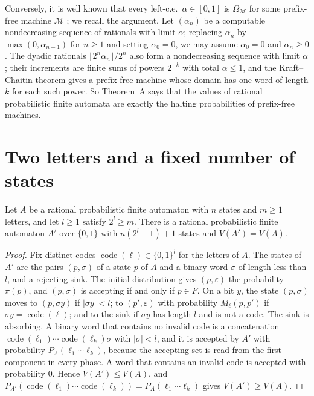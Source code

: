 \documentclass[11pt]{article}
\theoremstyle{plain}
\theoremstyle{definition}
\theoremstyle{remark}
\newcommand{\eps}{\varepsilon}
\newcommand{\code}{\operatorname{code}}
\begin{document}
\begin{remark}\label{rem:halting}
Conversely, it is well known that every left-c.e.\ $\alpha\in[0,1]$ is $\Omega_{\mathcal M}$ for some prefix-free machine $\mathcal M$ \cite{CHKW01,DH10}; we recall the argument. Let $(\alpha_n)$ be a computable nondecreasing sequence of rationals with limit $\alpha$; replacing $\alpha_n$ by $\max(0,\alpha_{n-1})$ for $n\ge1$ and setting $\alpha_0=0$, we may assume $\alpha_0=0$ and $\alpha_n\ge0$. The dyadic rationals $\lfloor2^n\alpha_n\rfloor/2^n$ also form a nondecreasing sequence with limit $\alpha$; their increments are finite sums of powers $2^{-k}$ with total $\alpha\le1$, and the Kraft--Chaitin theorem \cite{Cha75,DH10} gives a prefix-free machine whose domain has one word of length $k$ for each such power. So Theorem~A says that the values of rational probabilistic finite automata are exactly the halting probabilities of prefix-free machines.
\end{remark}

\section{Two letters and a fixed number of states}\label{sec:binary}

\begin{lemma}\label{lem:binary}
Let $A$ be a rational probabilistic finite automaton with $n$ states and $m\ge1$ letters, and let $l\ge1$ satisfy $2^l\ge m$. There is a rational probabilistic finite automaton $A'$ over $\{0,1\}$ with $n(2^l-1)+1$ states and $V(A')=V(A)$.
\end{lemma}

\begin{proof}
Fix distinct codes $\code(\ell)\in\{0,1\}^l$ for the letters of $A$. The states of $A'$ are the pairs $(p,\sigma)$ of a state $p$ of $A$ and a binary word $\sigma$ of length less than $l$, and a rejecting sink. The initial distribution gives $(p,\eps)$ the probability $\pi(p)$, and $(p,\sigma)$ is accepting if and only if $p\in F$. On a bit $y$, the state $(p,\sigma)$ moves to $(p,\sigma y)$ if $|\sigma y|<l$; to $(p',\eps)$ with probability $M_\ell(p,p')$ if $\sigma y=\code(\ell)$; and to the sink if $\sigma y$ has length $l$ and is not a code. The sink is absorbing. A binary word that contains no invalid code is a concatenation $\code(\ell_1)\cdots\code(\ell_k)\sigma$ with $|\sigma|<l$, and it is accepted by $A'$ with probability $P_A(\ell_1\cdots\ell_k)$, because the accepting set is read from the first component in every phase. A word that contains an invalid code is accepted with probability $0$. Hence $V(A')\le V(A)$, and $P_{A'}(\code(\ell_1)\cdots\code(\ell_k))=P_A(\ell_1\cdots\ell_k)$ gives $V(A')\ge V(A)$.
\end{proof}
\end{document}
